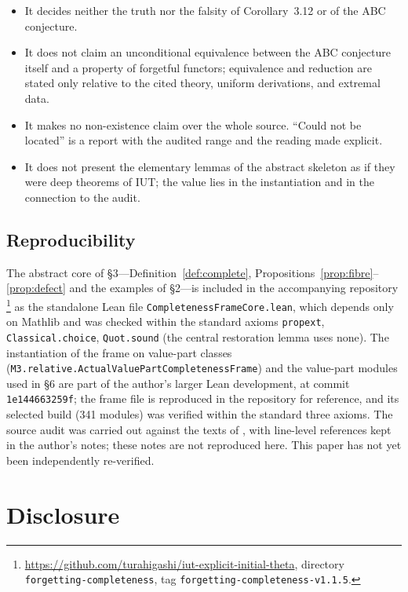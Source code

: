 \documentclass[11pt]{article}
\theoremstyle{plain}
\theoremstyle{definition}
\theoremstyle{remark}
\begin{document}
\begin{itemize}
\item It decides neither the truth nor the falsity of
Corollary~3.12 or of the ABC conjecture.
\item It does not claim an unconditional equivalence between the ABC
conjecture itself and a property of forgetful functors; equivalence
and reduction are stated only relative to the cited theory, uniform
derivations, and extremal data.
\item It makes no non-existence claim over the whole source.
``Could not be located'' is a report with the audited range and the
reading made explicit.
\item It does not present the elementary lemmas of the abstract
skeleton as if they were deep theorems of IUT; the value lies in
the instantiation and in the connection to the audit.
\end{itemize}

\subsection*{Reproducibility}

The abstract core of \S3---Definition~\ref{def:complete},
Propositions~\ref{prop:fibre}--\ref{prop:defect} and the examples
of \S2---is included in the accompanying repository%
\footnote{\url{https://github.com/turahigashi/iut-explicit-initial-theta},
directory \texttt{forgetting-completeness}, tag
\texttt{forgetting-completeness-v1.1.5}.}
as the standalone Lean file \texttt{CompletenessFrameCore.lean},
which depends only on Mathlib and was checked within the standard
axioms \texttt{propext}, \texttt{Classical.choice},
\texttt{Quot.sound} (the central restoration lemma uses none).  The
instantiation of the frame on value-part classes
(\texttt{M3.relative.ActualValuePartCompletenessFrame}) and the
value-part modules used in \S6 are part of the author's larger Lean
development, at commit \texttt{1e144663259f}; the frame file is
reproduced in the repository for reference, and its selected build
(341 modules) was verified within the standard three axioms.  The
source audit was carried out against the texts of
\cite{IUT1,IUT2,IUT3,IUT4,FrdI,EtTh,AbsTopIII}, with line-level
references kept in the author's notes; these notes are not reproduced
here.  This paper has not yet been independently re-verified.

\section*{Disclosure}
\end{document}
